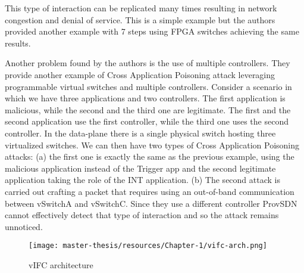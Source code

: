 \documentclass[a4paper,10pt]{memoir}
\begin{document}
This type of interaction can be replicated many times resulting in network congestion and denial of service. This is a simple example but the authors provided another example with 7 steps using FPGA switches achieving the same results.
\medskip

Another problem found by the authors is the use of multiple controllers. They provide another example of Cross Application Poisoning attack leveraging programmable virtual switches and multiple controllers. Consider a scenario in which we have three applications and two controllers. The first application is malicious, while the second and the third one are legitimate. The first and the second application use the first controller, while the third one uses the second controller. In the data-plane there is a single physical switch hosting three virtualized switches. We can then have two types of Cross Application Poisoning attacks: (a) the first one is exactly the same as the previous example, using the malicious application instead of the Trigger app and the second legitimate application taking the role of the INT application. (b) The second attack is carried out crafting a packet that requires using an out-of-band communication between vSwitchA and vSwitchC. Since they use a different controller ProvSDN cannot effectively detect that type of interaction and so the attack remains unnoticed.
\medskip

\begin{wrapfigure}[17]{h}{0.55\textwidth}
\caption{vIFC architecture}
\label{fig:vcap}
\texttt{[image: master-thesis/resources/Chapter-1/vifc-arch.png]}
\end{wrapfigure}
\end{document}
